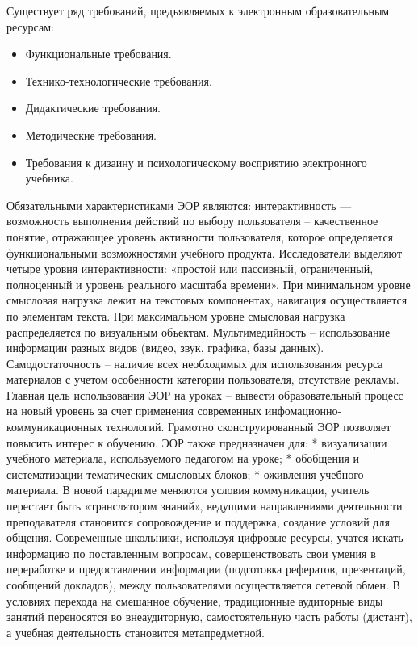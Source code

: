 Существует ряд требований, предъявляемых к электронным образовательным ресурсам:
\begin{itemize}
\item Функциональные требования. 
\item Технико-технологические требования. 
\item Дидактические требования. 
\item Методические требования. 
\item Требования к дизаину и психологическому восприятию электронного учебника.
\end{itemize}
Обязательными характеристиками ЭОР являются: интерактивность --- возможность выполнения действий по выбору пользователя – качественное понятие, отражающее уровень активности пользователя, которое определяется функциональными возможностями учебного продукта.
Исследователи выделяют четыре уровня интерактивности: «простой или пассивный, ограниченный, полноценный и уровень реального масштаба времени»\cite{kochisov15}.
При минимальном уровне смысловая нагрузка лежит на текстовых компонентах, навигация осуществляется по элементам текста. При максимальном уровне смысловая нагрузка распределяется по визуальным объектам.
Мультимедийность – использование информации разных видов (видео, звук, графика, базы данных).
Самодостаточность – наличие всех необходимых для использования ресурса материалов с учетом особенности категории пользователя, отсутствие рекламы.
Главная цель использования ЭОР на уроках – вывести образовательный процесс на новый уровень за счет применения современных инфомационно-коммуникационных технологий.
Грамотно сконструированный ЭОР позволяет повысить интерес к обучению.
ЭОР также предназначен для:
* визуализации учебного материала, используемого педагогом на уроке;
* обобщения и систематизации тематических смысловых блоков;
* оживления учебного материала.
В новой парадигме меняются условия коммуникации, учитель перестает быть «транслятором знаний», ведущими направлениями деятельности преподавателя становится сопровождение и поддержка, создание условий для общения.
Современные школьники, используя цифровые ресурсы, учатся искать информацию по поставленным вопросам, совершенствовать свои умения в переработке и предоставлении информации (подготовка рефератов, презентаций, сообщений докладов), между пользователями осуществляется сетевой обмен\cite{shevardina}.
В условиях перехода на смешанное обучение, традиционные аудиторные виды занятий переносятся во внеаудиторную, самостоятельную часть работы (дистант), а учебная деятельность становится метапредметной.
